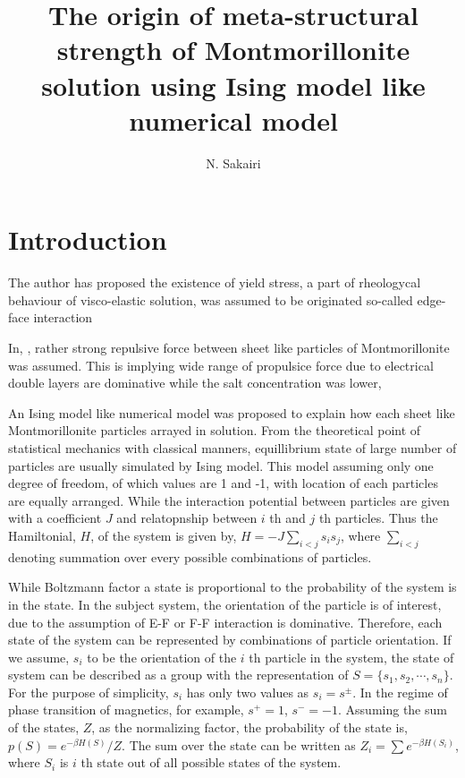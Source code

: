 \documentclass{article}
\author{N. Sakairi}
\title{The origin of meta-structural strength of Montmorillonite solution using Ising model like numerical model}
\begin{document}
\maketitle

\section{Introduction}
The author has proposed the existence of yield stress, a part of rheologycal behaviour of visco-elastic solution,
was assumed to be originated so-called edge-face interaction \cite{sposito}\cite{adachi}\cite{sakairi}

In, \cite{sakairi}, rather strong repulsive force between sheet like particles of Montmorillonite was assumed.
This is implying wide range of propulsice force due to electrical double layers are dominative while the salt concentration was lower,


An Ising model like numerical model was proposed to explain how each sheet like Montmorillonite particles arrayed in solution.
From the theoretical point of statistical mechanics with classical manners, equillibrium state of large number of particles 
are usually simulated by Ising model. This model assuming only one degree of freedom, of which values are 1 and -1, with 
location of each particles are equally arranged.
While the interaction potential between particles are given with a coefficient $J$ and relatopnship between $i$ th and $j$ th particles.
Thus the Hamiltonial, $H$, of the system is given by, $H = -J\sum_{i<j} s_is_j$, 
where $\sum_{i<j}$ denoting summation over every possible combinations of particles.

While Boltzmann factor a state is proportional to the probability of the system is in the state.
In the subject system, the orientation of the particle is of interest, due to the assumption of E-F or F-F interaction is dominative.
Therefore, each state of the system can be represented by combinations of particle orientation.
If we assume, $s_i$ to be the orientation of the $i$ th particle in the system, the state of system can be described as a group with the representation of 
 $S = \{s_1, s_2, \cdots, s_n\}$.
For the purpose of simplicity, $s_i$ has only two values as $s_i = s^{\pm}$. 
In the regime of phase transition of magnetics, for example, $s^+ = 1$, $s^- = -1$.
Assuming the sum of the states, $Z$, as the normalizing factor, the probability of the state is, $p (S) = e^{-\beta H(S)} / Z$. 
The sum over the state can be written as $Z_i = \sum e^{-\beta H (S_i)}$, where $S_i$ is $i$ th state out of all possible states of the system.
\end{document}
